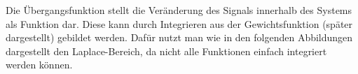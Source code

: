 Die Übergangsfunktion stellt die Veränderung des Signals innerhalb des Systems als Funktion dar. Diese
kann durch Integrieren aus der Gewichtsfunktion (später dargestellt) gebildet werden. Dafür nutzt man wie
in den folgenden Abbildungen dargestellt den Laplace-Bereich, da nicht alle Funktionen einfach integriert
werden können.
\vspace*{0.5cm}
\begin{figure}[h]
    \begin{center}
    \end{center}
\end{figure}
\vspace*{0.5cm}

